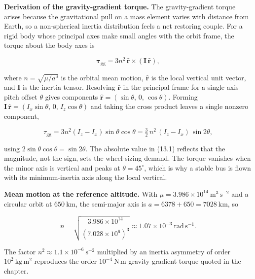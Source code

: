 \documentclass[
  11pt,
  openany,
  oneside]{book}
\begin{document}
\textbf{Derivation of the gravity-gradient torque.} The gravity-gradient
torque arises because the gravitational pull on a mass element varies
with distance from Earth, so a non-spherical inertia distribution feels
a net restoring couple. For a rigid body whose principal axes make small
angles with the orbit frame, the torque about the body axes is

\begin{equation}
\boldsymbol{\tau}_{\mathrm{gg}} = 3 n^2\, \hat{\mathbf{r}} \times (\mathbf{I}\,\hat{\mathbf{r}}), \tag{13.2}
\end{equation}

where \(n = \sqrt{\mu/a^3}\) is the orbital mean motion,
\(\hat{\mathbf{r}}\) is the local vertical unit vector, and
\(\mathbf{I}\) is the inertia tensor. Resolving \(\hat{\mathbf{r}}\) in
the principal frame for a single-axis pitch offset \(\theta\) gives
components \(\hat{\mathbf{r}} = (\sin\theta,\, 0,\, \cos\theta)\).
Forming
\(\mathbf{I}\,\hat{\mathbf{r}} = (I_x \sin\theta,\, 0,\, I_z \cos\theta)\)
and taking the cross product leaves a single nonzero component,

\begin{equation}
\tau_{\mathrm{gg}} = 3 n^2 (I_z - I_x)\sin\theta\cos\theta = \tfrac{3}{2}\, n^2\, (I_z - I_x)\, \sin 2\theta, \tag{13.3}
\end{equation}

using \(2\sin\theta\cos\theta = \sin 2\theta\). The absolute value in
(13.1) reflects that the magnitude, not the sign, sets the wheel-sizing
demand. The torque vanishes when the minor axis is vertical and peaks at
\(\theta = 45^\circ\), which is why a stable bus is flown with its
minimum-inertia axis along the local vertical.

\textbf{Mean motion at the reference altitude.} With
\(\mu = 3.986\times10^{14}\ \mathrm{m^3\,s^{-2}}\) and a circular orbit
at \(650\ \mathrm{km}\), the semi-major axis is
\(a = 6378 + 650 = 7028\ \mathrm{km}\), so

\begin{equation}
n = \sqrt{\frac{3.986\times10^{14}}{(7.028\times10^{6})^3}} \approx 1.07\times10^{-3}\ \mathrm{rad\,s^{-1}}. \tag{13.4}
\end{equation}

The factor \(n^2 \approx 1.1\times10^{-6}\ \mathrm{s^{-2}}\) multiplied
by an inertia asymmetry of order \(10^{2}\ \mathrm{kg\,m^2}\) reproduces
the order \(10^{-4}\ \mathrm{N\,m}\) gravity-gradient torque quoted in
the chapter.
\end{document}
